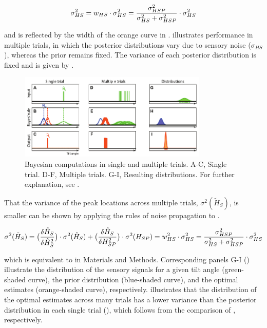 \begin{equation}
\label{p1:eqn16}
\sigma^2_{HS} = w_{HS} \cdot \sigma^2_{HS} \\
              = \frac{\sigma^2_{HSP}}{\sigma^2_{HS} + \sigma^2_{HSP}} \cdot \sigma^2_{HS}
\end{equation}

and is reflected by the width of the orange curve in .  illustrates performance in multiple trials, in which the posterior distributions vary due to sensory noise ($\sigma_{HS}$), whereas the prior remains fixed. The variance of each posterior distribution is fixed and is given by . 

\begin{figure}
    \includegraphics[width=0.80\textwidth]{src/paper1/figure8.pdf}
    \caption{Bayesian computations in single and multiple trials. A-C, Single trial. D-F, Multiple trials. G-I, Resulting distributions. For further explanation, see .}
    \label{p1:fig8}
\end{figure}

That the variance of the peak locations across multiple trials, $\sigma^2(\tilde{H}_S)$, is smaller can be shown by applying the rules of noise propagation to . 

\begin{equation}
\label{p1:eqn17}
\sigma^2(\tilde{H}_S) = \\
	\big( \frac{\delta\tilde{H}_S}{\delta\hat{H}_S^2} \big) \cdot \\
	\sigma^2(\hat{H}_S) + \\
	\big( \frac{\delta\tilde{H}_S}{\delta H_{SP}^2} \big) \cdot \\
	\sigma^2(H_{SP}) \\
	= w^2_{HS} \cdot \sigma^2_{HS} \\
	= \frac{\sigma^2_{HSP}}{\sigma^2_{HS} + \sigma^2_{HSP}} \cdot \sigma^2_{HS}
\end{equation}

which is equivalent to  in Materials and Methods. Corresponding panels G-I () illustrate the distribution of the sensory signals for a given tilt angle (green-shaded curve), the prior distribution (blue-shaded curve), and the optimal estimates (orange-shaded curve), respectively.  illustrates that the distribution of the optimal estimates across many trials has a lower variance than the posterior distribution in each single trial (), which follows from the comparison of , respectively. 


